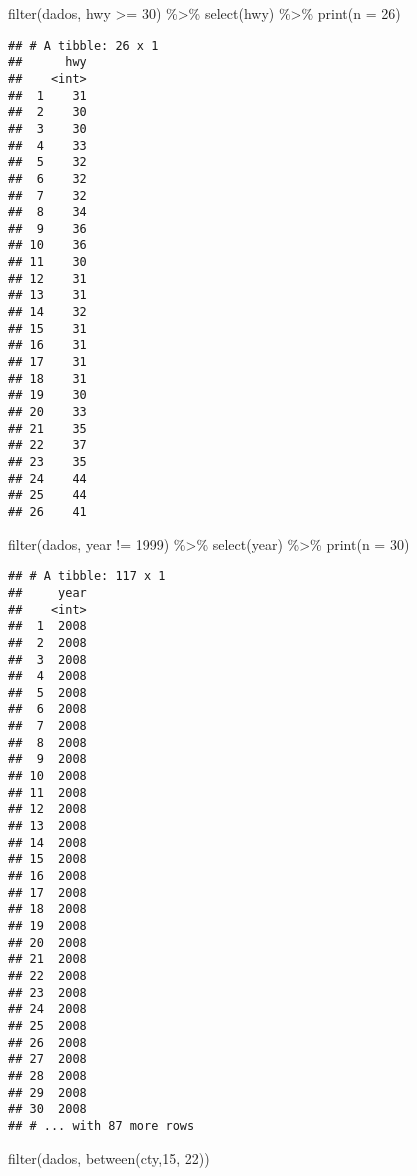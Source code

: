 \documentclass[
]{book}
\newenvironment{Shaded}{\begin{snugshade}}{\end{snugshade}}
\newcommand{\AttributeTok}[1]{\textcolor[rgb]{0.77,0.63,0.00}{#1}}
\newcommand{\DecValTok}[1]{\textcolor[rgb]{0.00,0.00,0.81}{#1}}
\newcommand{\FunctionTok}[1]{\textcolor[rgb]{0.00,0.00,0.00}{#1}}
\newcommand{\NormalTok}[1]{#1}
\newcommand{\SpecialCharTok}[1]{\textcolor[rgb]{0.00,0.00,0.00}{#1}}
\begin{document}
\begin{Shaded}
\begin{Highlighting}[]
\FunctionTok{filter}\NormalTok{(dados, hwy }\SpecialCharTok{\textgreater{}=} \DecValTok{30}\NormalTok{) }\SpecialCharTok{\%\textgreater{}\%} 
  \FunctionTok{select}\NormalTok{(hwy) }\SpecialCharTok{\%\textgreater{}\%}
  \FunctionTok{print}\NormalTok{(}\AttributeTok{n =} \DecValTok{26}\NormalTok{)}
\end{Highlighting}
\end{Shaded}

\begin{verbatim}
## # A tibble: 26 x 1
##      hwy
##    <int>
##  1    31
##  2    30
##  3    30
##  4    33
##  5    32
##  6    32
##  7    32
##  8    34
##  9    36
## 10    36
## 11    30
## 12    31
## 13    31
## 14    32
## 15    31
## 16    31
## 17    31
## 18    31
## 19    30
## 20    33
## 21    35
## 22    37
## 23    35
## 24    44
## 25    44
## 26    41
\end{verbatim}

\begin{Shaded}
\begin{Highlighting}[]
\FunctionTok{filter}\NormalTok{(dados, year }\SpecialCharTok{!=} \DecValTok{1999}\NormalTok{) }\SpecialCharTok{\%\textgreater{}\%} 
  \FunctionTok{select}\NormalTok{(year) }\SpecialCharTok{\%\textgreater{}\%}
  \FunctionTok{print}\NormalTok{(}\AttributeTok{n =} \DecValTok{30}\NormalTok{)}
\end{Highlighting}
\end{Shaded}

\begin{verbatim}
## # A tibble: 117 x 1
##     year
##    <int>
##  1  2008
##  2  2008
##  3  2008
##  4  2008
##  5  2008
##  6  2008
##  7  2008
##  8  2008
##  9  2008
## 10  2008
## 11  2008
## 12  2008
## 13  2008
## 14  2008
## 15  2008
## 16  2008
## 17  2008
## 18  2008
## 19  2008
## 20  2008
## 21  2008
## 22  2008
## 23  2008
## 24  2008
## 25  2008
## 26  2008
## 27  2008
## 28  2008
## 29  2008
## 30  2008
## # ... with 87 more rows
\end{verbatim}

\begin{Shaded}
\begin{Highlighting}[]
\FunctionTok{filter}\NormalTok{(dados, }\FunctionTok{between}\NormalTok{(cty,}\DecValTok{15}\NormalTok{, }\DecValTok{22}\NormalTok{)) }
\end{Highlighting}
\end{Shaded}
\end{document}
